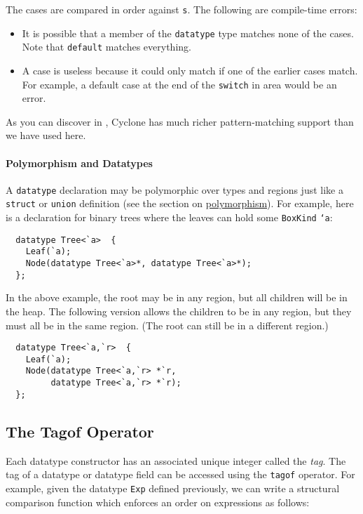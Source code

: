 The cases are compared in order against \texttt{s}.  The following are
compile-time errors:
\begin{itemize}
\item It is possible that a member of the \texttt{datatype} type matches
  none of the cases.  Note that \texttt{default} matches everything.
\item A case is useless because it could only match if one of the
  earlier cases match.  For example, a default case at the end of the
  \texttt{switch} in area would be an error.
\end{itemize}

As you can discover in , Cyclone has much
richer pattern-matching support than we have used here.

\paragraph{Polymorphism and Datatypes} A \texttt{datatype} declaration may be
polymorphic over types and regions just like a \texttt{struct}
or \texttt{union} definition (see the section on
\hyperlink{polymorphism}{polymorphism}).  For example, here is a
declaration for binary trees where the leaves can hold some
\texttt{BoxKind} \texttt{`a}:
\begin{verbatim}
  datatype Tree<`a>  {
    Leaf(`a);
    Node(datatype Tree<`a>*, datatype Tree<`a>*);
  };
\end{verbatim}

In the above example, the root may be in any region, but all children
will be in the heap.  The following version allows the children to be in any
region, but they must all be in the same region.  (The root can still
be in a different region.)

\begin{verbatim}
  datatype Tree<`a,`r>  {
    Leaf(`a);
    Node(datatype Tree<`a,`r> *`r, 
         datatype Tree<`a,`r> *`r);
  };
\end{verbatim}

\subsection{The Tagof Operator}\hypertarget{tagof_sec}{}

Each datatype constructor has an associated unique integer called the
\emph{tag}.  The tag of a datatype or datatype field can be accessed
using the \texttt{tagof} operator.  For example, given the 
datatype \texttt{Exp} defined previously, we can write a 
structural comparison function which enforces an order on
expressions as follows:

